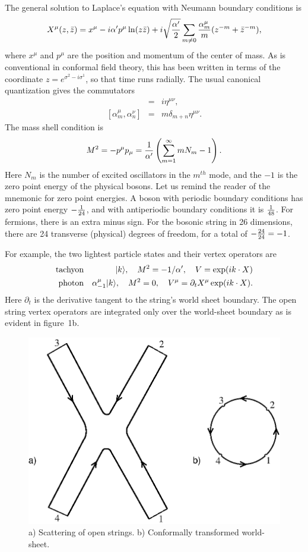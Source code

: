 \documentclass[12pt]{article}
\def\be{\begin{equation}}
\def\ee{\end{equation}}
\def\bea{\begin{eqnarray}}
\def\eea{\end{eqnarray}}
\def\ap{\alpha'}
\newcommand{\zb}{{\bar{z}}}
\begin{document}
The general solution to Laplace's equation with Neumann boundary conditions
is 
\be
X^\mu(z,\zb) = x^\mu - i\ap p^\mu
\ln(z\zb) + i\sqrt{\ap\over2} \sum_{m\neq0} {\alpha_m^\mu\over
m}(z^{-m}+\zb^{-m}),
\ee
where $x^\mu$ and $p^\mu$ are the position and momentum of the center of
mass.  As is conventional in conformal field theory, this has been
written in terms of the coordinate $z=e^{\sigma^2-i\sigma^1}$, so that
time runs radially.
The usual canonical quantization gives the commutators
\bea
[x^\mu,p^\nu] &=& i\eta^{\mu\nu}, \nonumber\\
{}[\alpha_m^\mu,\alpha_n^\nu] &=& m\delta_{m+n}\eta^{\mu\nu}.
\eea
The mass shell condition is
\be
M^2 = -p^\mu p_\mu = {1\over\ap}\left(\sum_{m=1}^\infty
mN_m-1\right).
\ee
Here $N_m$ is the number of excited oscillators in the
$m^{th}$ mode, and the $-1$ is the zero point energy of the physical
bosons.  Let us remind the reader of the mnemonic for zero point energies.  A
boson with periodic boundary conditions has zero point energy
$-{1\over24}$, and with antiperiodic boundary conditions it is $1\over48$.
For fermions, there is an extra minus sign.  For the bosonic string in 26
dimensions, there are 24 transverse (physical) degrees of freedom, for a
total of $-{24\over24} = -1$.

For example, the two lightest particle states and their vertex operators are
\bea
{\rm tachyon}&&
|{ k}\rangle, \quad M^2=-{1/\ap},\quad V=\exp({i{ k}\cdot { X}})
\nonumber\\
{\rm photon}&& \alpha^\mu_{-1}|{ k}\rangle, \quad
M^2 =0, \quad V^\mu=\partial_t X^\mu
\exp({i{ k}\cdot{ X}}). \label{particles}
\eea
Here $\partial_t$
is the derivative tangent to the string's world sheet boundary.  The
open string vertex operators are integrated only over the world-sheet
boundary as is evident in figure~1b.
\begin{figure}
\begin{center}
\leavevmode
\includegraphics{oscat1.eps}
\end{center}
\caption[]{a) Scattering of open strings.  b) Conformally transformed
world-sheet.}
\end{figure}
\end{document}
